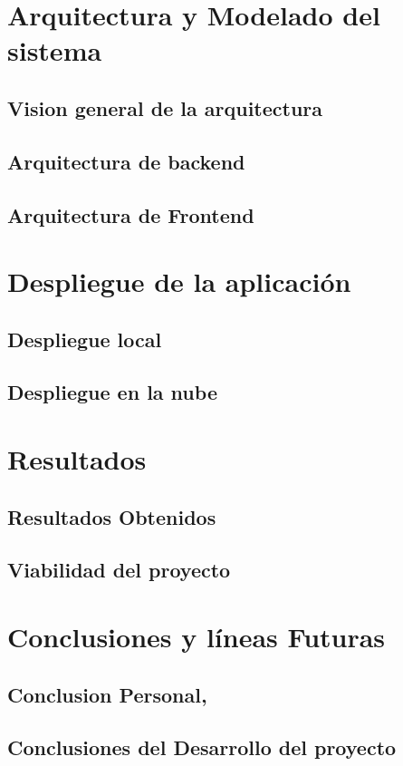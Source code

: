 \documentclass[12pt, a4paper, twoside]{article}
\begin{document}
\section{Arquitectura y Modelado del sistema }
\subsection{Vision general de la arquitectura }
\subsection{Arquitectura de backend}
\subsection{Arquitectura de Frontend}


\section{Despliegue de la aplicación  }
\subsection{ Despliegue local }
\subsection{ Despliegue en la nube }



\section{Resultados}
\subsection{Resultados Obtenidos}
\subsection{Viabilidad del proyecto}


\section{Conclusiones y líneas Futuras }
\subsection{Conclusion Personal,}
\subsection{Conclusiones del Desarrollo del proyecto}
\end{document}

